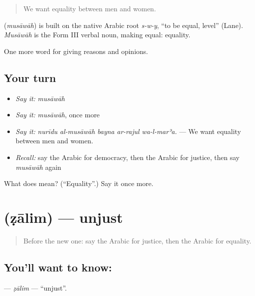 \begin{quote}
We want equality between men and women.
\end{quote}

\begin{cousinweb}
\textbf{} (\emph{musāwāh}) is built on the native Arabic root \emph{s-w-y}, \textquotedblleft{}to be equal, level\textquotedblright{} (Lane). \emph{Musāwāh} is the Form III verbal noun, making equal: equality.
\end{cousinweb}

\begin{grammarlens}[title={What you've built}]
One more word for giving reasons and opinions.
\end{grammarlens}

\subsection*{Your turn}
\begin{itemize}
\raggedright
  \item \emph{Say it:} \emph{musāwāh}
  \item \emph{Say it:} \emph{musāwāh}, once more
  \item \emph{Say it:} \emph{nurīdu al-musāwāh bayna ar-rajul wa-l-marʾa.} — We want equality between men and women.
  \item \emph{Recall:} say the Arabic for democracy, then the Arabic for justice, then say \emph{musāwāh} again
\end{itemize}

\begin{tcolorbox}[breakable,colback=teal!4,colframe=teal!35!black,title={Before you move on}]
What does  mean? (\textquotedblleft{}Equality\textquotedblright{}.) Say it once more.
\end{tcolorbox}
\section[\texorpdfstring{\ar{ظالم} (ẓālim)}{ظالم (ẓālim)}]{ (ẓālim) — unjust}

\label{lesson:AR-C380-zalim}



\begin{quote}
Before the new one: say the Arabic for justice, then the Arabic for equality.
\end{quote}

\subsection*{You'll want to know: }
\textbf{} — \emph{ẓālim} — \textquotedblleft{}unjust\textquotedblright{}.

